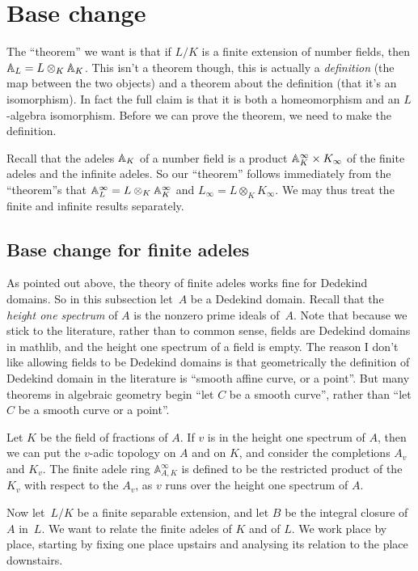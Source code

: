 \section{Base change}

The ``theorem'' we want is that if $L/K$ is a finite extension of number fields,
then $\mathbb{A}_L=L\otimes_K\mathbb{A}_K$. This isn't a theorem though, this is actually a \emph{definition}
(the map between the two objects) and a theorem about
the definition (that it's an isomorphism). In fact the full claim is that it is both a homeomorphism
and an $L$-algebra isomorphism. Before we can prove the theorem, we need to make the
definition.

Recall that the adeles $\mathbb{A}_K$ of a number field is a product $\mathbb{A}_K^\infty\times K_\infty$
of the finite adeles and the infinite adeles. So our ``theorem'' follows immediately from
the ``theorem''s that $\mathbb{A}_L^\infty=L\otimes_K\mathbb{A}_K^\infty$ and $L_\infty=L\otimes_KK_\infty$.
We may thus treat the finite and infinite results separately.

\subsection{Base change for finite adeles}

As pointed out above, the theory of finite adeles works fine for Dedekind domains.
So in this subsection let~$A$ be a Dedekind domain. Recall that the \emph{height one spectrum}
of $A$ is the nonzero prime ideals of~$A$. Note that because we stick to the literature,
rather than to common sense, fields are Dedekind domains in mathlib, and the
height one spectrum of a field is empty. The reason I don't like allowing fields
to be Dedekind domains is that geometrically the definition of Dedekind
domain in the literature is ``smooth affine curve, or a point''. But many theorems in algebraic
geometry begin ``let $C$ be a smooth curve'', rather than ``let $C$ be a smooth curve or a point''.

Let $K$ be the field of fractions of $A$. If $v$ is in the height one spectrum of $A$,
then we can put the $v$-adic topology on $A$ and on $K$, and consider the completions
$A_v$ and $K_v$. The finite adele ring $\mathbb{A}_{A,K}^\infty$ is defined to be
the restricted product of the $K_v$ with respect to the $A_v$, as $v$ runs over
the height one spectrum of $A$.

Now let~$L/K$ be a finite separable extension, and let $B$ be the integral closure of~$A$ in~$L$.
We want to relate the finite adeles of $K$ and of $L$. We work place by place, starting by fixing
one place upstairs and analysing its relation to the place downstairs.

